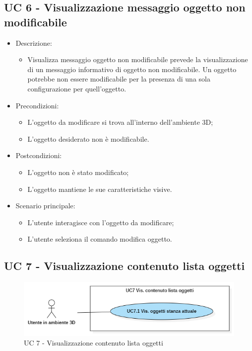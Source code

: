\subsection{UC 6 - Visualizzazione messaggio oggetto non modificabile}
\begin{itemize}

	\item Descrizione:
	\begin{itemize}
		\item Visualizza messaggio oggetto non modificabile prevede la visualizzazione di un messaggio informativo di oggetto non modificabile.
\newline Un oggetto potrebbe non essere modificabile per la presenza di una sola configurazione per quell'oggetto.
	\end{itemize}
	
	\item Precondizioni:
	\begin{itemize}
		\item L'oggetto da modificare si trova all'interno dell'ambiente 3D;
		\item L'oggetto desiderato non è modificabile.
	\end{itemize}
	
	\item Postcondizioni:
	\begin{itemize}
		\item L'oggetto non è stato modificato;
		\item L'oggetto mantiene le sue caratteristiche visive.
	\end{itemize}
	
	\item Scenario principale:
	\begin{itemize}
		\item L'utente interagisce con l'oggetto da modificare;
		\item L'utente seleziona il comando modifica oggetto.
	\end{itemize}
	
\end{itemize}

\subsection{UC 7 - Visualizzazione contenuto lista oggetti}

\begin{figure}[H]
  \renewcommand{\thefigure}{7}
  \includegraphics[width=\linewidth]{./res/images/UC7.png}
  \caption{UC 7 - Visualizzazione contenuto lista oggetti}
  \label{fig:UC 7}
\end{figure}

